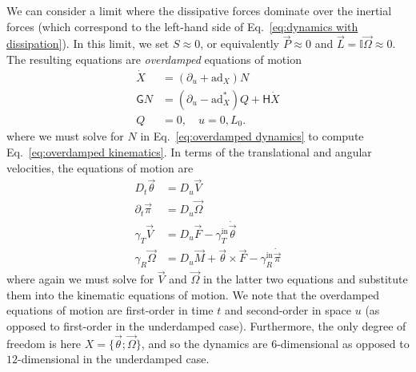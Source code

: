 We can consider a limit where the dissipative forces dominate over the inertial forces (which correspond to the left-hand side of Eq.~\ref{eq:dynamics with dissipation}). In this limit, we set $S \approx 0$, or equivalently $\vec{P} \approx 0$ and $\vec{L} = \mathbb{I} \vec{\Omega} \approx 0$. The resulting equations are \textit{overdamped} equations of motion
\begin{subequations} 
\begin{align}
\dot{X} & = (\partial_u + \text{ad}_X ) N \label{eq:overdamped kinematics} \\
\mathsf{G} N & = \left( \partial_u - \text{ad}_X^* \right) Q + \mathsf{H} \dot{X} \label{eq:overdamped dynamics} \\
Q & = 0, \quad u = 0, L_0.
\end{align}
\end{subequations}
where we must solve for $N$ in Eq.~\ref{eq:overdamped dynamics} to compute Eq.~\ref{eq:overdamped kinematics}. In terms of the translational and angular velocities, the equations of motion are
\begin{subequations} \label{eq:overdamped equations of motion in moving frame}
\begin{align}
D_t \vec{\theta} & = D_u \vec{V} \\
\partial_t \vec{\pi} & = D_u \vec{\Omega} \\
\gamma_T \vec{V} & = D_u \vec{F} - \gamma^\text{in}_T \dot{\vec{\theta}}  \\
\gamma_R \vec{\Omega} & = D_u \vec{M} + \vec{\theta} \times \vec{F}  - \gamma^\text{in}_R \dot{\vec{\pi}}
\end{align}
\end{subequations}
where again we must solve for $\vec{V}$ and $\vec{\Omega}$ in the latter two equations and substitute them into the kinematic equations of motion. We note that the overdamped equations of motion are first-order in time $t$ and second-order in space $u$ (as opposed to first-order in the underdamped case). Furthermore, the only degree of freedom is here $X = \{ \vec{\theta} ; \vec{\Omega} \}$, and so the dynamics are $6$-dimensional as opposed to $12$-dimensional in the underdamped case.

